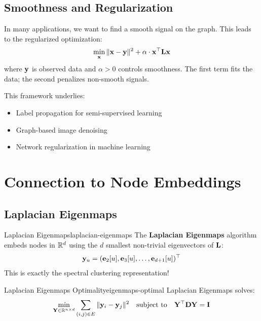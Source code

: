 \begin{notechapter}
\subsection{Smoothness and Regularization}

\begin{keyidea}
In many applications, we want to find a smooth signal on the graph. This leads to the regularized optimization:
\begin{equation}
\min_{\mathbf{x}} \| \mathbf{x} - \mathbf{y} \|^2 + \alpha \cdot \mathbf{x}^\top \mathbf{L} \mathbf{x}
\end{equation}
where $\mathbf{y}$ is observed data and $\alpha > 0$ controls smoothness. The first term fits the data; the second penalizes non-smooth signals.

This framework underlies:
\begin{itemize}
    \item Label propagation for semi-supervised learning
    \item Graph-based image denoising
    \item Network regularization in machine learning
\end{itemize}
\end{keyidea}

\section{Connection to Node Embeddings}

\subsection{Laplacian Eigenmaps}

\begin{definition}{Laplacian Eigenmaps}{laplacian-eigenmaps}
The \textbf{Laplacian Eigenmaps} algorithm embeds nodes in $\mathbb{R}^d$ using the $d$ smallest non-trivial eigenvectors of $\mathbf{L}$:
\begin{equation}
\mathbf{y}_u = (\mathbf{e}_2[u], \mathbf{e}_3[u], \ldots, \mathbf{e}_{d+1}[u])^\top
\end{equation}
This is exactly the spectral clustering representation!
\end{definition}

\begin{theorem}{Laplacian Eigenmaps Optimality}{eigenmaps-optimal}
Laplacian Eigenmaps solves:
\begin{equation}
\min_{\mathbf{Y} \in \mathbb{R}^{n \times d}} \sum_{(i,j) \in E} \| \mathbf{y}_i - \mathbf{y}_j \|^2 \quad \text{subject to} \quad \mathbf{Y}^\top \mathbf{D} \mathbf{Y} = \mathbf{I}
\end{equation}
\end{theorem}


\end{notechapter}
